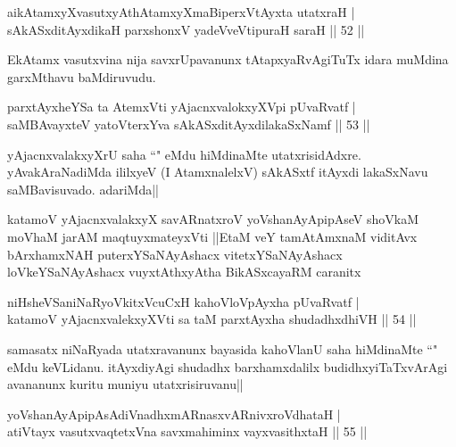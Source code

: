 \begin{shl}
aikAtamxyXvasutxyAthAtamxyXmaBiperxVtAyxta utatxraH |\\
sAkASxditAyxdikaH parxshonxV yadeVveVtipuraH saraH \hfill || 52 ||
\end{shl}

\begin{artha}
EkAtamx vasutxvina nija savxrUpavanunx tAtapxyaRvAgiTuTx idara muMdina garxMthavu baMdiruvudu. 
\end{artha}


\begin{shl}
parxtAyxheYSa ta AtemxVti yAjacnxvalokxyXV\s pi pUvaRvatf |\\
saMBAvayxteV yatoV\s terxYva sAkASxditAyxdilakaSxNamf \hfill || 53 ||
\end{shl}

\begin{artha}
yAjacnxvalakxyXrU saha ``\stext " eMdu hiMdinaMte utatxrisidAdxre. yAvakAraNadiMda ililxyeV (I AtamxnalelxV) sAkASxtf itAyxdi lakaSxNavu saMBavisuvado. adariMda||
\end{artha}

\begin{shl}
katamoV yAjacnxvalakxyX savARnatxroV yoV\s shanAyApipAseV shoVkaM moVhaM jarAM maqtuyxmateyxVti ||EtaM veY tamAtAmxnaM viditAvx bArxhamxNAH puterxYSaNAyAshacx vitetxYSaNAyAshacx loVkeYSaNAyAshacx vuyxtAthxyAtha BikASxcayaRM caranitx
\end{shl}

\begin{shl}
niHsheVSaniNaRyoVkitxVcuCxH kahoVloV\s pAyxha pUvaRvatf |\\
katamoV yAjacnxvalekxyXVti sa taM parxtAyxha shudadhxdhiVH \hfill || 54 ||
\end{shl}

\begin{artha}%
samasatx niNaRyada utatxravanunx bayasida kahoVlanU saha hiMdinaMte ``\stext" eMdu keVLidanu. \stext itAyxdiyAgi shudadhx barxhamxdalilx budidhxyiTaTxvArAgi avananunx kuritu muniyu utatxrisiruvanu||
\end{artha}


\begin{shl}
yoV\s shanAyApipAsAdiVnadhxmARnasxvARnivxroVdhataH |\\
atiVtayx vasutxvaqtetxVna savxmahiminx vayxvasithxtaH \hfill || 55 ||
\end{shl}

